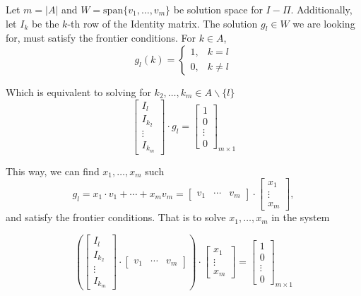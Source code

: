 Let $m = |A|$ and $W = \text{span}\{v_1,\ldots, v_m\}$ be solution space for $I-\Pi$. Additionally, let $I_k$ be the $k$-th row of the Identity matrix. The solution $g_l \in W$ we are looking for, must satisfy the frontier conditions. For $k \in A$,
\[ g_l(k) = \begin{cases}
    1, & k = l\\
    0, & k \neq l
\end{cases} \]

Which is equivalent to solving for $k_2,\ldots, k_m \in A\backslash\{l\}$
\[ \left[ \begin{matrix}
    I_l\\ \hline
    I_{k_2}\\\hline
    \vdots\\\hline
    I_{k_m}
\end{matrix} \right] \cdot g_l = {\left[ \begin{matrix}
    1\\
    0\\
    \vdots\\
    0
\end{matrix} \right]}_{m\times 1} \]

This way, we can find $x_1,\ldots, x_m$ such
\[ g_l = x_1\cdot v_1 + \cdots + x_m v_m = \left[ \begin{array}{c|c|c}
    v_1 & \cdots & v_m
\end{array} \right] \cdot \left[ \begin{matrix}
    x_1\\
    \vdots\\
    x_m
\end{matrix} \right],\]
and satisfy the frontier conditions. That is to solve $x_1,\ldots, x_m$ in the system

\[ \left( \left[ \begin{matrix}
    I_l\\ \hline
    I_{k_2}\\\hline
    \vdots\\\hline
    I_{k_m}
\end{matrix} \right] 
\cdot
\left[ \begin{array}{c|c|c}
    v_1 & \cdots & v_m
\end{array} \right]  \right)\cdot \left[ \begin{matrix}
    x_1\\
    \vdots\\
    x_m
\end{matrix} \right] = {\left[ \begin{matrix}
    1\\ 
    0\\
    \vdots\\
    0
\end{matrix} \right]}_{m\times 1}  \]

